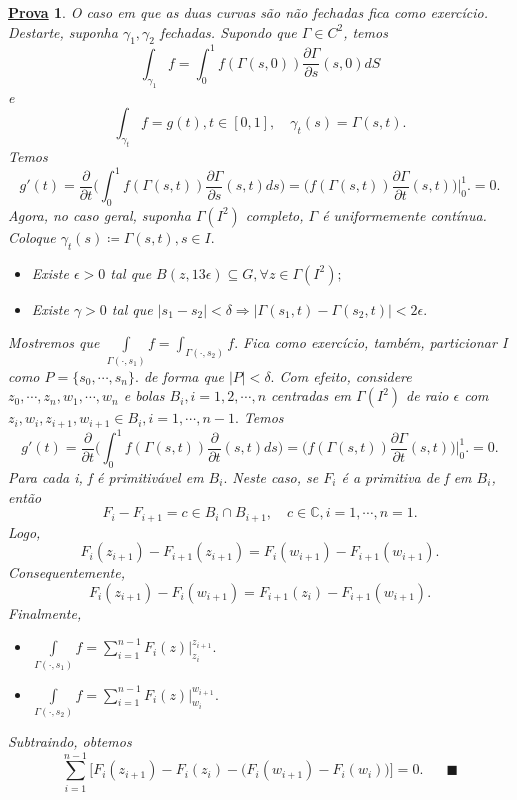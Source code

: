 \documentclass{article}
\newtheorem*{proof*}{\underline{Prova}}
\renewcommand\qedsymbol{$\blacksquare$}
\begin{document}
  \begin{proof*}
    O caso em que as duas curvas s\~ao n\~ao fechadas fica como exerc\'icio. Destarte, suponha $\gamma_{1}, \gamma_{2}$ fechadas. 
    Supondo que $\Gamma\in{C^{2}}$, temos
    $$
    \int_{\gamma_{1}}^{}f = \int_{0}^{1}f(\Gamma(s, 0))\frac{\partial{\Gamma}}{\partial{s}}(s, 0)dS
    $$
    e
    $$
    \int_{\gamma_{t}}^{}f = g(t), t\in[0, 1], \quad \gamma_{t}(s) = \Gamma(s, t).
    $$
    Temos
    $$
    g'(t) = \frac{\partial{}}{\partial{t}}\biggl(\int_{0}^{1}f(\Gamma(s, t))\frac{\partial{\Gamma}}{\partial{s}}(s, t)ds\biggr) = \biggl(f(\Gamma(s,t ))\frac{\partial{\Gamma}}{\partial{t}}(s, t)\biggr)\biggl|_0^1\biggr. = 0.
    $$
    Agora, no caso geral, suponha $\Gamma(I^2)$ completo, $\Gamma$ \'e uniformemente cont\'inua. Coloque $\gamma_{t}(s)\coloneqq  \Gamma(s, t), s\in{I}.$
    \begin{itemize}
      \item[1)] Existe $\epsilon > 0$ tal que $B(z, 13 \epsilon)\subseteq{G},\forall z\in{\Gamma(I^2)};$
      \item[2)] Existe $\gamma > 0$ tal que $|s_1 - s_2| < \delta\Rightarrow |\Gamma(s_1, t) - \Gamma(s_2, t)| < 2 \epsilon.$ 
    \end{itemize}
    Mostremos que $\int\limits_{\Gamma(\cdot, s_1)}^{}f = \int_{\Gamma(\cdot, s_2)}^{}f.$ Fica como exerc\'icio, tamb\'em, particionar
    I como $P=\{s_{0}, \cdots, s_{n}\}.$ de forma que $|P| < \delta.$ Com efeito, considere $z_{0}, \cdots, z_{n}, w_{1}, \cdots, w_{n}$ e bolas
    $B_{i}, i = 1, 2, \cdots, n$ centradas em $\Gamma(I^2)$ de raio $\epsilon$ com $z_{i}, w_{i}, z_{i+1}, w_{i+1}\in{B_{i}}, i = 1, \cdots, n-1.$
    Temos 
    $$
    g'(t) = \frac{\partial{}}{\partial{t}}\biggl(\int_{0}^{1}f(\Gamma(s, t))\frac{\partial{}}{\partial{t}}(s, t)ds\biggr) = \biggl(f(\Gamma(s, t))\frac{\partial{\Gamma}}{\partial{t}}(s, t)\biggr)\biggl|_0^1\biggr. = 0.
    $$
    Para cada i, f \'e primitiv\'avel em $B_{i}.$ Neste caso, se $F_{i}$ \'e a primitiva de f em $B_{i}$, ent\~ao
    $$
    F_{i} - F_{i+1} = c \in B_{i}\cap{B_{i+1}}, \quad c\in \mathbb{C}, i=1, \cdots, n=1.
    $$
    Logo,
    $$
    F_{i}(z_{i+1}) - F_{i+1}(z_{i+1}) = F_{i}(w_{i+1}) - F_{i+1}(w_{i+1}).
    $$
    Consequentemente, 
    $$
    F_{i}(z_{i+1}) - F_{i}(w_{i+1}) = F_{i+1}(z_{i}) - F_{i+1}(w_{i+1}).
    $$
    Finalmente, 
    \begin{itemize}
      \item[I)] $\int\limits_{\Gamma(\cdot, s_{1})}^{}f = \sum\limits_{i=1}^{n-1}F_{i}(z)\biggl|_{z_{i}}^{z_{i+1}}\biggr.$
      \item[II)] $\int\limits_{\Gamma(\cdot, s_2)}^{}f = \sum\limits_{i=1}^{n-1}F_{i}(z)\biggl|_{w_{i}}^{w_{i+1}}\biggr.$
    \end{itemize}
    Subtraindo, obtemos
    $$
    \sum\limits_{i=1}^{n-1}\biggl[F_{i}(z_{i+1}) - F_{i}(z_{i}) - \biggl(F_{i}(w_{i+1}) - F_{i}(w_{i})\biggr)\biggr] = 0.\quad\text{ \qedsymbol}
    $$
  \end{proof*}
\end{document}
